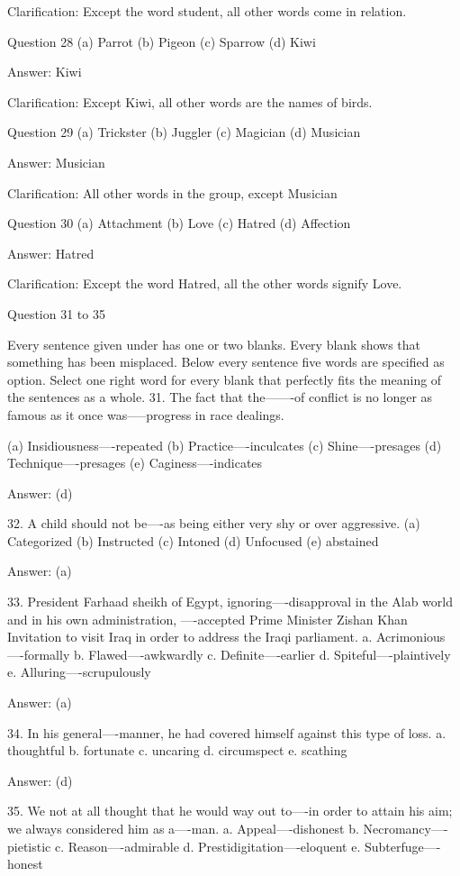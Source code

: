 Clarification: Except the word student, all other words come in relation.

Question 28
(a) Parrot
(b) Pigeon
(c) Sparrow
(d) Kiwi

Answer: Kiwi

Clarification: Except Kiwi, all other words are the names of birds.

Question 29
(a) Trickster
(b) Juggler
(c) Magician
(d) Musician

Answer: Musician

Clarification: All other words in the group, except Musician

Question 30
(a) Attachment
(b) Love
(c) Hatred
(d) Affection

Answer: Hatred

Clarification: Except the word Hatred, all the other words signify Love.



Question 31 to 35

Every sentence given under has one or two blanks. Every blank shows that something has been misplaced. Below every sentence five words are specified as option. Select one right word for every blank that perfectly fits the meaning of the sentences as a whole.
31. The fact that the-------of conflict is no longer as famous as it once was-----progress in race dealings.

(a) Insidiousness----repeated
(b) Practice----inculcates
(c) Shine----presages
(d) Technique----presages
(e) Caginess----indicates

Answer: (d)

32. A child should not be----as being either very shy or over aggressive.
(a) Categorized
(b) Instructed
(c) Intoned
(d) Unfocused
(e) abstained

Answer: (a)

33. President Farhaad sheikh of Egypt, ignoring----disapproval in the Alab world and in his own administration, ----accepted Prime Minister Zishan Khan Invitation to visit Iraq in order to address the Iraqi parliament.
a. Acrimonious----formally
b. Flawed----awkwardly
c. Definite----earlier
d. Spiteful----plaintively
e. Alluring----scrupulously

Answer: (a)

34. In his general----manner, he had covered himself against this type of loss.
a. thoughtful
b. fortunate
c. uncaring
d. circumspect
e. scathing

Answer: (d)

35. We not at all thought that he would way out to----in order to attain his aim; we always considered him as a----man.
a. Appeal----dishonest
b. Necromancy----pietistic
c. Reason----admirable
d. Prestidigitation----eloquent
e. Subterfuge----honest


